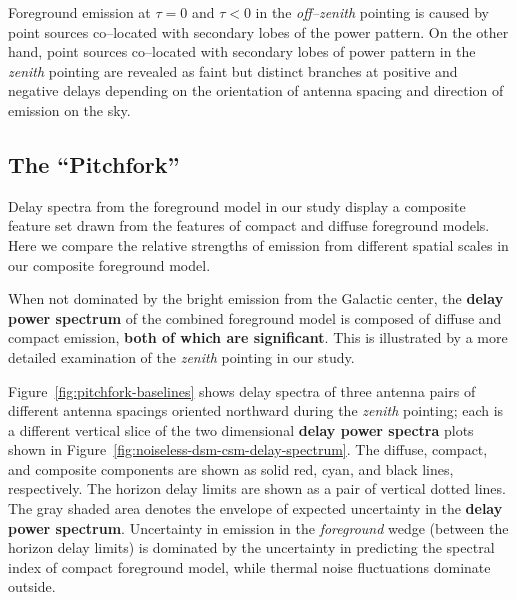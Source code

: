 \documentclass[preprint2,iop,numberedappendix]{emulateapj}
\begin{document}
Foreground emission at $\tau=0$ and $\tau<0$ in the {\it off--zenith} pointing is caused by point sources co--located with secondary lobes of the power pattern. On the other hand, point sources co--located with secondary lobes of power pattern in the {\it zenith} pointing are revealed as faint but distinct branches at positive and negative delays depending on the orientation of antenna spacing and direction of emission on the sky. 

\subsection{The ``Pitchfork''}\label{sec:composite}

Delay spectra from the foreground model in our study display a composite feature set drawn from the features of compact and diffuse foreground models. Here we compare the relative strengths of emission from different spatial scales in our composite foreground model. 

When not dominated by the bright emission from the Galactic center, the {\bf delay power spectrum} of the combined foreground model is composed of diffuse and compact emission, {\bf both of which are significant}. This is illustrated by a more detailed examination of the {\it zenith} pointing in our study. 

Figure~\ref{fig:pitchfork-baselines} shows delay spectra of three antenna pairs of different antenna spacings oriented northward during the {\it zenith} pointing; each is a different vertical slice of the two dimensional {\bf delay power spectra} plots shown in Figure~\ref{fig:noiseless-dsm-csm-delay-spectrum}. The diffuse, compact, and composite components are shown as solid red, cyan, and black lines, respectively. The horizon delay limits are shown as a pair of vertical dotted lines. The gray shaded area denotes the envelope of expected uncertainty in the {\bf delay power spectrum}. Uncertainty in emission in the {\it foreground} wedge (between the horizon delay limits) is dominated by the %
uncertainty in predicting the spectral index of compact foreground model, while thermal noise fluctuations dominate outside. 
\end{document}
